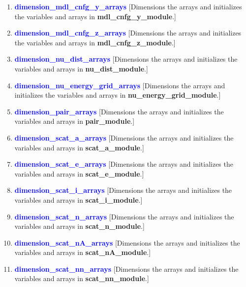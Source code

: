 \documentclass[11pt,doublespace]{article}
\begin{document}
\begin{itemize}
\begin{enumerate}
\begin{enumerate}
\begin{enumerate}
\begin{enumerate}
  \item \textcolor{blue}{ {\bf dimension\_mdl\_cnfg\_y\_arrays} }
  [Dimensions the arrays and initializes the variables and arrays in {\bf  mdl\_cnfg\_y\_module}.]

  \item \textcolor{blue}{ {\bf dimension\_mdl\_cnfg\_z\_arrays} }
  [Dimensions the arrays and initializes the variables and arrays in {\bf mdl\_cnfg\_z\_module}.]

  \item \textcolor{blue}{ {\bf dimension\_nu\_dist\_arrays} }
  [Dimensions the arrays and initializes the variables and arrays in {\bf nu\_dist\_module}.]

  \item \textcolor{blue}{ {\bf dimension\_nu\_energy\_grid\_arrays} }
  [Dimensions the arrays and initializes the variables and arrays in {\bf nu\_energy\_grid\_module}.]

  \item \textcolor{blue}{ {\bf dimension\_pair\_arrays} }
  [Dimensions the arrays and initializes the variables and arrays in {\bf pair\_module}.]

  \item \textcolor{blue}{ {\bf dimension\_scat\_a\_arrays} }
  [Dimensions the arrays and initializes the variables and arrays in {\bf scat\_a\_module}.]

  \item \textcolor{blue}{ {\bf dimension\_scat\_e\_arrays} }
  [Dimensions the arrays and initializes the variables and arrays in {\bf scat\_e\_module}.]

  \item \textcolor{blue}{ {\bf dimension\_scat\_i\_arrays} }
  [Dimensions the arrays and initializes the variables and arrays in {\bf scat\_i\_module}.]

  \item \textcolor{blue}{ {\bf dimension\_scat\_n\_arrays} }
  [Dimensions the arrays and initializes the variables and arrays in {\bf scat\_n\_module}.]

  \item \textcolor{blue}{ {\bf dimension\_scat\_nA\_arrays} }
  [Dimensions the arrays and initializes the variables and arrays in {\bf scat\_nA\_module}.]

  \item \textcolor{blue}{ {\bf dimension\_scat\_nn\_arrays} }
  [Dimensions the arrays and initializes the variables and arrays in {\bf scat\_nn\_module}.]


\end{enumerate}
\end{enumerate}
\end{enumerate}
\end{enumerate}
\end{itemize}
\end{document}

